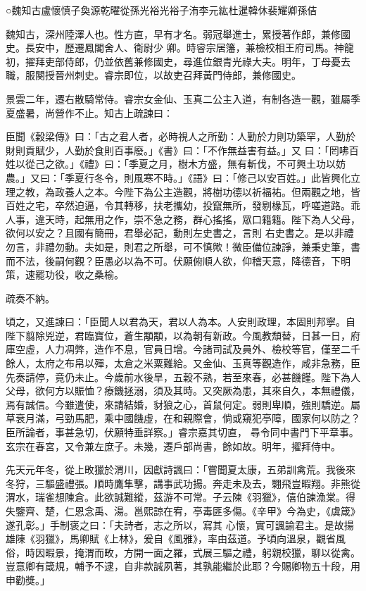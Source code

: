 
\begin{pinyinscope}

 ○魏知古盧懷慎子奐源乾曜從孫光裕光裕子洧李元紘杜暹韓休裴耀卿孫佶



 魏知古，深州陸澤人也。性方直，早有才名。弱冠舉進士，累授著作郎，兼修國史。長安中，歷遷鳳閣舍人、衛尉少
 卿。時睿宗居籓，兼檢校相王府司馬。神龍初，擢拜吏部侍郎，仍並依舊兼修國史，尋進位銀青光祿大夫。明年，丁母憂去職，服闋授晉州刺史。睿宗即位，以故吏召拜黃門侍郎，兼修國史。



 景雲二年，遷右散騎常侍。睿宗女金仙、玉真二公主入道，有制各造一觀，雖屬季夏盛暑，尚營作不止。知古上疏諫曰：



 臣聞《穀梁傳》曰：「古之君人者，必時視人之所勤：人勤於力則功築罕，人勤於財則貢賦少，人勤於食則百事廢。」《書》曰：「不作無益害有益。」又
 曰：「罔咈百姓以從己之欲。」《禮》曰：「季夏之月，樹木方盛，無有斬伐，不可興土功以妨農。」又曰：「季夏行冬令，則風寒不時。」《語》曰：「修己以安百姓。」此皆興化立理之教，為政養人之本。今陛下為公主造觀，將樹功德以祈福祐。但兩觀之地，皆百姓之宅，卒然迫逼，令其轉移，扶老攜幼，投竄無所，發剔椽瓦，呼嗟道路。乖人事，違天時，起無用之作，崇不急之務，群心搖搖，眾口籍籍。陛下為人父母，欲何以安之？且國有簡冊，君舉必記，動則左史書之，言則
 右史書之。是以非禮勿言，非禮勿動。夫如是，則君之所舉，可不慎歟！微臣備位諫諍，兼秉史筆，書而不法，後嗣何觀？臣愚必以為不可。伏願俯順人欲，仰稽天意，降德音，下明策，速罷功役，收之桑榆。



 疏奏不納。



 頃之，又進諫曰：「臣聞人以君為天，君以人為本。人安則政理，本固則邦寧。自陛下翦除兇逆，君臨寶位，蒼生顒顒，以為朝有新政。今風教頹替，日甚一日，府庫空虛，人力凋弊，造作不息，官員日增。今諸司試及員外、檢校等官，僅至二千
 餘人，太府之布帛以殫，太倉之米粟難給。又金仙、玉真等觀造作，咸非急務，臣先奏請停，竟仍未止。今歲前水後旱，五穀不熟，若至來春，必甚饑饉。陛下為人父母，欲何方以賑恤？療饑拯溺，須及其時。又突厥為患，其來自久，本無禮儀，焉有誠信。今雖遣使，來請結婚，豺狼之心，首鼠何定。弱則卑順，強則驕逆。屬草衰月滿，弓勁馬肥，乘中國饑虛，在和親際會，倘或窺犯亭障，國家何以防之？臣所論者，事甚急切，伏願特垂詳察。」睿宗嘉其切直，
 尋令同中書門下平章事。玄宗在春宮，又令兼左庶子。未幾，遷戶部尚書，餘如故。明年，擢拜侍中。



 先天元年冬，從上畋獵於渭川，因獻詩諷曰：「嘗聞夏太康，五弟訓禽荒。我後來冬狩，三驅盛禮張。順時鷹隼擊，講事武功揚。奔走未及去，翾飛豈暇翔。非熊從渭水，瑞雀想陳倉。此欲誠難縱，茲游不可常。子云陳《羽獵》，僖伯諫漁棠。得失鑒齊、楚，仁恩念禹、湯。邕熙諒在宥，亭毒匪多傷。《辛甲》今為史，《虞箴》遂孔彰。」手制褒之曰：「夫詩者，志之所以，寫其
 心懷，實可諷諭君主。是故揚雄陳《羽獵》，馬卿賦《上林》，爰自《風雅》，率由茲道。予頃向溫泉，觀省風俗，時因暇景，掩渭而畋，方開一面之羅，式展三驅之禮，躬親校獵，聊以從禽。豈意卿有箴規，輔予不逮，自非款誠夙著，其孰能繼於此耶？今賜卿物五十段，用申勸獎。」




\end{pinyinscope}
